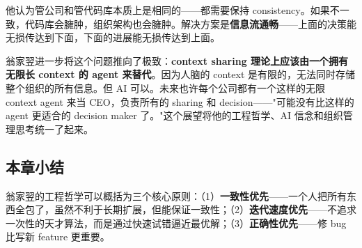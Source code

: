他认为管公司和管代码库本质上是相同的——都需要保持 consistency。如果不一致，代码库会臃肿，组织架构也会臃肿。解决方案是\textbf{信息流通畅}——上面的决策能无损传达到下面，下面的进展能无损传达到上面。

翁家翌进一步将这个问题推向了极致：\textbf{context sharing 理论上应该由一个拥有无限长 context 的 agent 来替代}。因为人脑的 context 是有限的，无法同时存储整个组织的所有信息。但 AI 可以。未来也许每个公司都有一个这样的无限 context agent 来当 CEO，负责所有的 sharing 和 decision——"可能没有比这样的 agent 更适合的 decision maker 了。"这个展望将他的工程哲学、AI 信念和组织管理思考统一了起来。

\subsection{本章小结}

翁家翌的工程哲学可以概括为三个核心原则：（1）\textbf{一致性优先}——一个人把所有东西全包了，虽然不利于长期扩展，但能保证一致性；（2）\textbf{迭代速度优先}——不追求一次性的天才算法，而是通过快速试错逼近最优解；（3）\textbf{正确性优先}——修 bug 比写新 feature 更重要。


